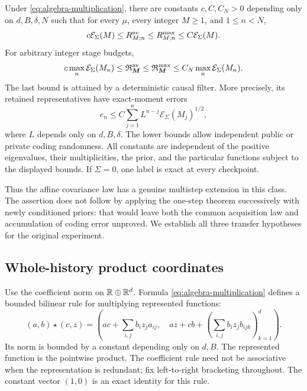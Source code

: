 \begin{theorem}
\label{thm:algebra-multistep}
Under \eqref{eq:algebra-multiplication}, there are constants $c,C,C_N>0$
depending only on $d,B,\delta,N$ such that for every $\mu$, every
integer $M\ge1$, and $1\le n<N$,
\begin{equation}\label{eq:algebra-checkpoint-law}
 c\mathcal E_\Sigma(M)\le R^{\rm av}_{M;n}
 \le R^{\rm max}_{M;n}\le C\mathcal E_\Sigma(M).
\end{equation}
For arbitrary integer stage budgets,
\begin{equation}\label{eq:algebra-causal-law}
 c\max_n\mathcal E_\Sigma(M_n)
 \le\mathfrak R^{\rm av}_{\boldsymbol M}
 \le\mathfrak R^{\rm max}_{\boldsymbol M}
 \le C_N\max_n\mathcal E_\Sigma(M_n).
\end{equation}
The last bound is attained by a deterministic causal filter. More
precisely, its retained representatives have exact-moment errors
\begin{equation}\label{eq:algebra-accumulation}
 e_n\le C\sum_{j=1}^n L^{n-j}\mathcal E_\Sigma(M_j)^{1/2},
\end{equation}
where $L$ depends only on $d,B,\delta$. The lower bounds allow independent
public or private coding randomness. All constants are independent of
the positive eigenvalues, their multiplicities, the prior, and the
particular functions subject to the displayed bounds. If $\Sigma=0$,
one label is exact at every checkpoint.
\end{theorem}

Thus the affine covariance law has a genuine multistep extension in this
class. The assertion does not follow by applying the one-step theorem
successively with newly conditioned priors: that would leave both the
common acquisition law and accumulation of coding error unproved.
We establish all three transfer hypotheses for the original experiment.

\subsection{Whole-history product coordinates}
Use the coefficient norm on $\mathbb R\oplus\mathbb R^d$. Formula
\eqref{eq:algebra-multiplication} defines a bounded bilinear rule for
multiplying represented functions:
\[
 (a,b)\star(c,z)=\left(ac+\sum_{i,j}b_i z_j a_{ij},\quad
             az+cb+\left(\sum_{i,j}b_i z_j b_{ijk}\right)_{k=1}^d\right).
\]
Its norm is bounded by a constant depending only on $d,B$.
The represented function is the pointwise product. The coefficient rule
need not be associative when the representation is redundant; fix
left-to-right bracketing throughout. The constant vector $(1,0)$ is
an exact identity for this rule.

